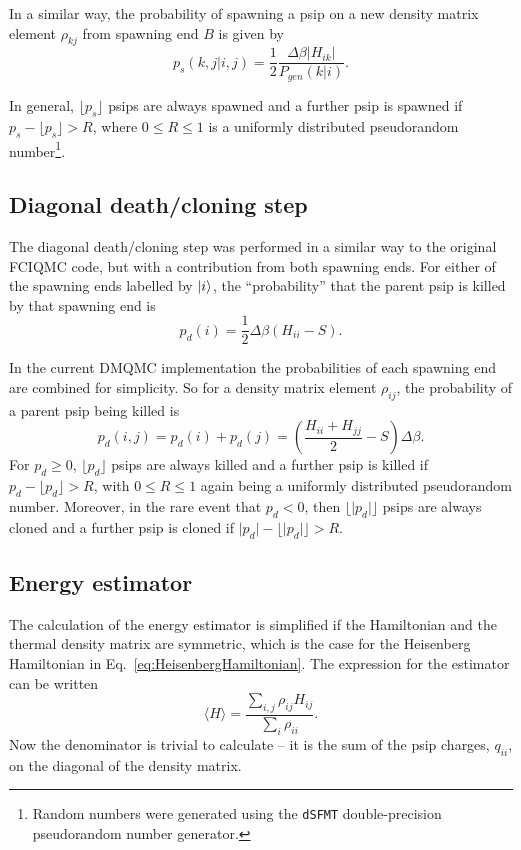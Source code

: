In a similar way, the probability of spawning a psip on a new density matrix element $\rho_{kj}$ from spawning end $B$ is given by
\begin{equation}
p_s(k, j | i,j) = \frac{1}{2}\frac{\Delta\beta\lvert H_{ik}\rvert}{P_{gen}(k|i)}.
\end{equation}

In general, $\lfloor p_s \rfloor$ psips are always spawned and a further psip is spawned if $p_s - \lfloor p_s\rfloor > R$, where $0 \le R \le 1$ is a uniformly distributed pseudorandom number\footnote{Random numbers were generated using the \texttt{dSFMT} double-precision pseudorandom number generator\cite{Saito2009}.}.

\subsection{Diagonal death/cloning step}
The diagonal death/cloning step was performed in a similar way to the original FCIQMC code, but with a contribution from both spawning ends. For either of the spawning ends labelled by $\ket{i}$, the ``probability'' that the parent psip is killed by that spawning end is
\begin{equation}
p_d(i) = \frac{1}{2}\Delta\beta(H_{ii}-S).
\end{equation}

In the current DMQMC implementation the probabilities of each spawning end are combined for simplicity. So for a density matrix element $\rho_{ij}$, the probability of a parent psip being killed is
\begin{equation}
p_d(i,j) = p_d(i) + p_d(j) = \left(\frac{H_{ii}+H_{jj}}{2} -S\right)\Delta\beta.
\end{equation}
For $p_d \ge 0$, $\lfloor p_d \rfloor$ psips are always killed and a further psip is killed if $p_d - \lfloor p_d\rfloor > R$, with $0 \le R \le 1$ again being a uniformly distributed pseudorandom number. Moreover, in the rare event that $p_d < 0$, then $\lfloor \lvert p_d \rvert \rfloor$ psips are always cloned and a further psip is cloned if  $\lvert p_d \rvert - \lfloor \lvert p_d \rvert\rfloor > R$.

\subsection{Energy estimator}
The calculation of the energy estimator is simplified if the Hamiltonian and the thermal density matrix are symmetric, which is the case for the Heisenberg Hamiltonian in Eq.~\ref{eq:HeisenbergHamiltonian}. The expression for the estimator can be written
\begin{equation}
\label{eq:energyEstimator}
\langle H\rangle = \frac{\sum_{i,j} \rho_{ij} H_{ij}}{\sum_i \rho_{ii}}.
\end{equation}
Now the denominator is trivial to calculate -- it is the sum of the psip charges, $q_{ii}$, on the diagonal of the density matrix.

